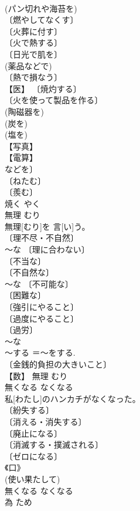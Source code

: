 \documentclass[8pt]{extreport}
\begin{document}
\begin{CJK}{UTF8}{min}
\\	(パン切れや海苔を) 
\\	〔燃やしてなくす〕 
\\	〔火葬に付す〕 
\\	〔火で熱する〕 
\\	〔日光で肌を〕 
\\	(薬品などで) 
\\	〔熱で損なう〕 
\\	【医】 〔焼灼する〕 
\\	〔火を使って製品を作る〕 
\\	(陶磁器を) 
\\	(炭を) 
\\	(塩を) 
\\	【写真】 
\\	【電算】 
\\	などを〕 
\\	〔ねたむ〕 
\\	〔羨む〕 
\\	[⇒やきもち]	焼く	やく	
\\	無理	むり	
\\	無理[むり]を 言[い]う。	
\\	〔理不尽・不自然〕 
\\	～な 〔理に合わない〕 
\\	〔不当な〕 
\\	〔不自然な〕 
\\	～な 〔不可能な〕 
\\	〔困難な〕 
\\	〔強引にやること〕 
\\	〔過度にやること〕 
\\	〔過労〕 
\\	～な 
\\	～する ＝～をする. 
\\	〔金銭的負担の大きいこと〕 
\\	【数】	無理	むり	
\\	無くなる	なくなる	
\\	私[わたし]のハンカチがなくなった。	
\\	〔紛失する〕 
\\	〔消える・消失する〕 
\\	〔廃止になる〕 
\\	〔消滅する・撲滅される〕 
\\	〔ゼロになる〕 
\\	《口》 
\\	(使い果たして) 
\\	無くなる	なくなる	
\\	為	ため	

\end{CJK}
\end{document}
